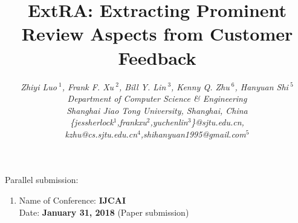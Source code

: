 \documentclass[11pt]{article}
\title{ExtRA: Extracting Prominent Review Aspects from Customer Feedback}
\begin{document}
\author{
	\fontsize{13}{13}\selectfont\itshape
	Zhiyi Luo{\small $~^{1}$}, Frank F. Xu{\small $~^{2}$},
	Bill Y. Lin{\small $~^{3}$},
	Kenny Q. Zhu{\small $~^{6}$},
	Hanyuan Shi{\small $~^{5}$}
	\vspace{2mm}\\
	\fontsize{12}{12}\selectfont\itshape
	Department of Computer Science \& Engineering\\
	Shanghai Jiao Tong University, Shanghai, China\\ 
	\fontsize{9}{9}\selectfont\ttfamily\upshape 
	\{jessherlock$^{1}$,frankxu$^{2}$,yuchenlin$^{3}$\}@sjtu.edu.cn,\\ 
	\fontsize{9}{9}\selectfont\ttfamily\upshape 
     kzhu@cs.sjtu.edu.cn$^{4}$,shihanyuan1995@gmail.com$^{5}$ 
}

\maketitle

Parallel submission:

\begin{enumerate}
	\item Name of Conference: {\bf IJCAI} \\ 
	Date: 
	 {\bf January 31, 2018} (Paper submission) 
\end{enumerate}
\end{document}
